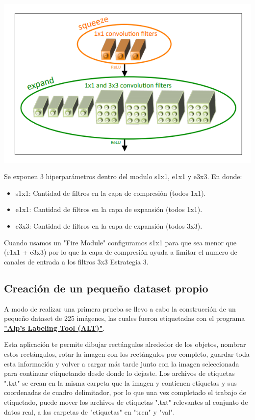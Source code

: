 \begin{center}
    \includegraphics[scale=0.7]{Tesis/Capitulos/02_MARCO_TEORICO/img/firemodule.png}
\end{center}

Se exponen 3 hiperparámetros dentro del modulo s1x1, e1x1 y e3x3. En donde:

\begin{itemize}
    \item s1x1: Cantidad de filtros en la capa de compresión (todos 1x1).
    \item e1x1: Cantidad de filtros en la capa de expansión (todos 1x1).
    \item e3x3: Cantidad de filtros en la capa de expansión (todos 3x3).
\end{itemize}

Cuando usamos un "Fire Module" configuramos s1x1 para que sea menor que (e1x1 + e3x3) por lo que la capa de compresión ayuda a limitar el numero de canales de entrada a los filtros 3x3 Estrategia 3.

\subsection{Creación de un pequeño dataset propio}

A modo de realizar una primera prueba se llevo a cabo la construcción de un pequeño dataset de 225 imágenes, las cuales fueron etiquetadas con el programa \href{https://alpslabel.wordpress.com/}{\textbf{"Alp’s Labeling Tool (ALT)"}}.

Esta aplicación te permite dibujar rectángulos alrededor de los objetos, nombrar estos rectángulos, rotar la imagen con los rectángulos por completo, guardar toda esta información y volver a cargar más tarde junto con la imagen seleccionada para continuar etiquetando desde donde lo dejaste. Los archivos de etiquetas ".txt" se crean en la misma carpeta que la imagen y contienen etiquetas y sus coordenadas de cuadro delimitador, por lo que una vez completado el trabajo de etiquetado, puede mover los archivos de etiquetas ".txt" relevantes al conjunto de datos real, a las carpetas de "etiquetas" en "tren" y "val".

